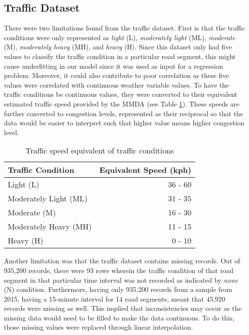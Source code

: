 \subsection{Traffic Dataset}
There were two limitations found from the traffic dataset. First is that the traffic conditions were only represented as \textit{light} (L), \textit{moderately light} (ML), \textit{moderate} (M), \textit{moderately heavy} (MH), and \textit{heavy} (H). Since this dataset only had five values to classify the traffic condition in a particular road segment, this might cause underfitting in our model since it was used as input for a regression problem. Moreover, it could also contribute to poor correlation as these five values were correlated with continuous weather variable values. To have the traffic conditions be continuous values, they were converted to their equivalent estimated traffic speed provided by the MMDA (see Table \ref{table_traffic_condition}). These speeds are further converted to congestion levels, represented as their reciprocal so that the data would be easier to interpret such that higher value means higher congestion level.

\begin{table}[h]
\centering
\caption{Traffic speed equivalent of traffic conditions}
\label{table_traffic_condition}
\begin{tabular}{|l|r|}
\hline
\textbf{Traffic Condition} & \multicolumn{1}{l|}{\textbf{Equivalent Speed (kph)}} \\ \hline
Light (L) & 36 - 60 \\ \hline
Moderately Light (ML) & 31 - 35 \\ \hline
Moderate (M) & 16 - 30 \\ \hline
Moderately Heavy (MH) & 11 - 15 \\ \hline
Heavy (H) & 0 - 10 \\ \hline
\end{tabular}
\end{table}

Another limitation was that the traffic dataset contains missing records. Out of 935,200 records, there were 93 rows wherein the traffic condition of that road segment in that particular time interval was not recorded as indicated by \textit{none} (N) condition. Furthermore, having only 935,200 records from a sample from 2015, having a 15-minute interval for 14 road segments, meant that 45,920 records were missing as well. This implied that inconsistencies may occur as the missing data would need to be filled to make the data continuous. To do this, those missing values were replaced through linear interpolation. 


